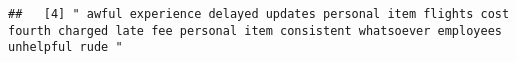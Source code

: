 \documentclass[
]{article}
\begin{document}
\begin{verbatim}
##   [4] " awful experience delayed updates personal item flights cost fourth charged late fee personal item consistent whatsoever employees unhelpful rude "                                                                                                                                                                                                                                                                                                                                                                                                                                                                                                                                                                                                                                                                                                                                                                                                                                                                                                                                                                                                                                                                                                                                                                                                                                                                                                                                                                                                                                                                                                                                                                                                                                            

\end{verbatim}
\end{document}
